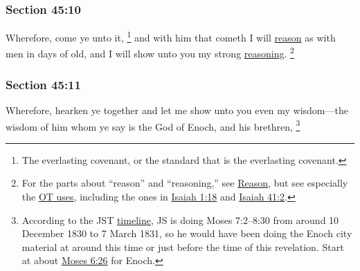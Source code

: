 
	\subsubsection{Section 45:10} %
		\label{DC45-10}

		Wherefore, come ye unto it,%
			\footnote{%
				The everlasting covenant, or the standard that is the everlasting covenant.
				}
		and with him that cometh I will \hyperref[REASON]{reason} as with men in days of old, and I will show unto you my strong \hyperref[REASON]{reasoning}.%
			\footnote{%
				For the parts about ``reason'' and ``reasoning,'' see \hyperref[REASON]{Reason}, but see especially the \hyperref[REASON-OT-KJV]{OT uses}, including the ones in \hyperref[ISAIAH-1-18]{Isaiah 1:18} and \hyperref[ISAIAH-41-21]{Isaiah 41:2}.
				}


	\subsubsection{Section 45:11} %
		\label{DC45-11}

		Wherefore, hearken ye together and let me show unto you even my wisdom---the wisdom of him whom ye say is the God of Enoch, and his brethren,%
			\footnote{%
				According to the JST \hyperref[JST-TIMELINE]{timeline}, JS is doing Moses 7:2--8:30 from around 10 December 1830 to 7 March 1831, so he would have been doing the Enoch city material at around this time or just before the time of this revelation. Start at about \hyperref[MOSES-6-26]{Moses 6:26} for Enoch.
				}


